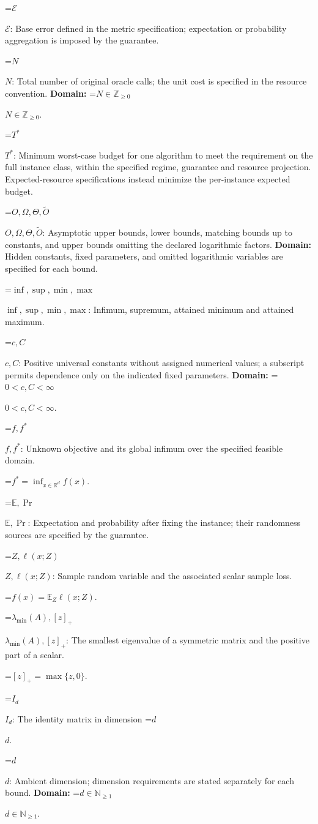 \documentclass[10pt,a4paper]{article}
\newcommand{\AtlasMath}[1]{\par\begingroup\centering\setbox0=\hbox{$\displaystyle #1$}\ifdim\wd0>1.4\linewidth\typeout{ATLAS WIDE FORMULA: \the\wd0}\fi\ifdim\wd0>\linewidth\resizebox{\linewidth}{!}{\box0}\else\box0\fi\par\endgroup}
\newcommand{\AtlasInlineMath}[1]{\begingroup\setbox0=\hbox{$#1$}\ifdim\wd0>.4\linewidth\endgroup\AtlasMath{#1}\else\endgroup$#1$\fi}
\begin{document}
\AtlasInlineMath{\mathcal{E}}: Base error defined in the metric specification; expectation or probability aggregation is imposed by the guarantee.

\AtlasInlineMath{N}: Total number of original oracle calls; the unit cost is specified in the resource convention. \textbf{Domain:} \AtlasInlineMath{N\in\mathbb{Z}_{\ge0}}.

\AtlasInlineMath{T^*}: Minimum worst-case budget for one algorithm to meet the requirement on the full instance class, within the specified regime, guarantee and resource projection. Expected-resource specifications instead minimize the per-instance expected budget.

\AtlasInlineMath{O,\Omega,\Theta,\widetilde{O}}: Asymptotic upper bounds, lower bounds, matching bounds up to constants, and upper bounds omitting the declared logarithmic factors. \textbf{Domain:} Hidden constants, fixed parameters, and omitted logarithmic variables are specified for each bound.

\AtlasInlineMath{\inf,\sup,\min,\max}: Infimum, supremum, attained minimum and attained maximum.

\AtlasInlineMath{c,C}: Positive universal constants without assigned numerical values; a subscript permits dependence only on the indicated fixed parameters. \textbf{Domain:} \AtlasInlineMath{0<c,C<\infty}.

\AtlasInlineMath{f,f^*}: Unknown objective and its global infimum over the specified feasible domain.


\AtlasMath{f^*=\inf_{x\in \mathbb{R}^d}f(x).}


\AtlasInlineMath{\mathbb{E},\Pr}: Expectation and probability after fixing the instance; their randomness sources are specified by the guarantee.

\AtlasInlineMath{Z,\ell(x;Z)}: Sample random variable and the associated scalar sample loss.


\AtlasMath{f(x)=\mathbb{E}_Z\ell(x;Z).}


\AtlasInlineMath{\lambda_{\min}(A),[z]_+}: The smallest eigenvalue of a symmetric matrix and the positive part of a scalar.


\AtlasMath{[z]_+=\max\{z,0\}.}


\AtlasInlineMath{I_d}: The identity matrix in dimension \AtlasInlineMath{d}.

\AtlasInlineMath{d}: Ambient dimension; dimension requirements are stated separately for each bound. \textbf{Domain:} \AtlasInlineMath{d\in\mathbb{N}_{\ge 1}}.
\end{document}
